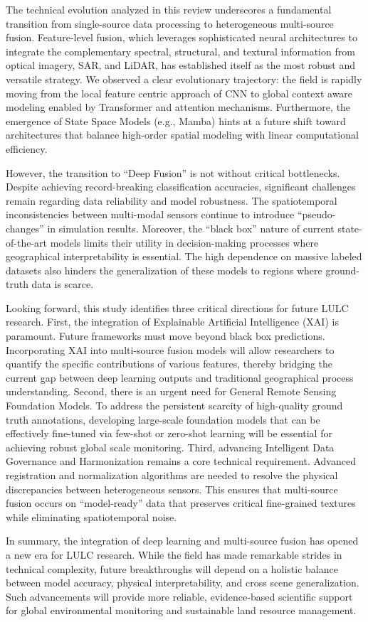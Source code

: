\documentclass[]{interact}
\theoremstyle{plain}%
\theoremstyle{definition}
\theoremstyle{remark}
\begin{document}
The technical evolution analyzed in this review underscores a fundamental transition from single-source data processing to heterogeneous multi-source fusion. Feature-level fusion, which leverages sophisticated neural architectures to integrate the complementary spectral, structural, and textural information from optical imagery, SAR, and LiDAR, has established itself as the most robust and versatile strategy. We observed a clear evolutionary trajectory: the field is rapidly moving from the local feature centric approach of CNN to global context aware modeling enabled by Transformer and attention mechanisms. Furthermore, the emergence of State Space Models (e.g., Mamba) hints at a future shift toward architectures that balance high-order spatial modeling with linear computational efficiency.

However, the transition to ``Deep Fusion'' is not without critical bottlenecks. Despite achieving record-breaking classification accuracies, significant challenges remain regarding data reliability and model robustness. The spatiotemporal inconsistencies between multi-modal sensors continue to introduce ``pseudo-changes'' in simulation results. Moreover, the ``black box'' nature of current state-of-the-art models limits their utility in decision-making processes where geographical interpretability is essential. The high dependence on massive labeled datasets also hinders the generalization of these models to regions where ground-truth data is scarce.

Looking forward, this study identifies three critical directions for future LULC research. First, the integration of Explainable Artificial Intelligence (XAI) is paramount. Future frameworks must move beyond black box predictions. Incorporating XAI into multi-source fusion models will allow researchers to quantify the specific contributions of various features, thereby bridging the current gap between deep learning outputs and traditional geographical process understanding. Second, there is an urgent need for General Remote Sensing Foundation Models. To address the persistent scarcity of high-quality ground truth annotations, developing large-scale foundation models that can be effectively fine-tuned via few-shot or zero-shot learning will be essential for achieving robust global scale monitoring. Third, advancing Intelligent Data Governance and Harmonization remains a core technical requirement. Advanced registration and normalization algorithms are needed to resolve the physical discrepancies between heterogeneous sensors. This ensures that multi-source fusion occurs on ``model-ready'' data that preserves critical fine-grained textures while eliminating spatiotemporal noise.

In summary, the integration of deep learning and multi-source fusion has opened a new era for LULC research. While the field has made remarkable strides in technical complexity, future breakthroughs will depend on a holistic balance between model accuracy, physical interpretability, and cross scene generalization. Such advancements will provide more reliable, evidence-based scientific support for global environmental monitoring and sustainable land resource management.




\end{document}
